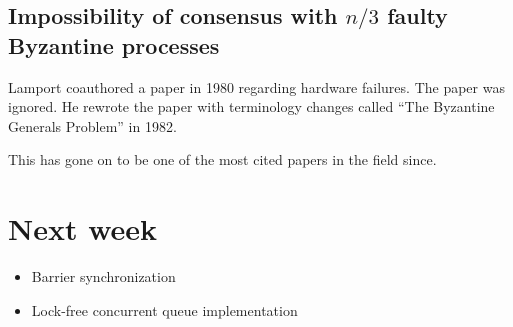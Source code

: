 \documentclass{idc_msc}
\begin{document}
\subsection{Impossibility of consensus with \texorpdfstring{$n/3$}{n/3} faulty Byzantine processes}

Lamport coauthored a paper in 1980 regarding hardware failures. The paper was ignored.
He rewrote the paper with terminology changes called ``The Byzantine Generals Problem'' in 1982.

This has gone on to be one of the most cited papers in the field since.

\section{Next week}

\begin{itemize}
  \item Barrier synchronization
  \item Lock-free concurrent queue implementation
\end{itemize}
\end{document}
